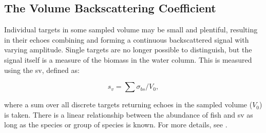 \subsection{The Volume Backscattering Coefficient}
    Individual targets in some sampled volume may be small and plentiful, resulting in their echoes combining and forming a continuous backscattered signal with varying amplitude. Single targets are no longer possible to distinguish, but the signal itself is a measure of the biomass in the water column. This is measured using the \gls{sv}, defined as:
    
    \begin{equation}
        s_{v} = \sum \sigma_{bs} / V_{0},
    \end{equation}
    
    where a sum over all discrete targets returning echoes in the sampled volume ($V_{0}$) is taken. There is a linear relationship between the abundance of fish and \gls{sv} as long as the species or group of species is known. For more details, see \citet{simmonds2008fisheries}.

%
%
%
%
%
%
%
%
%
%

